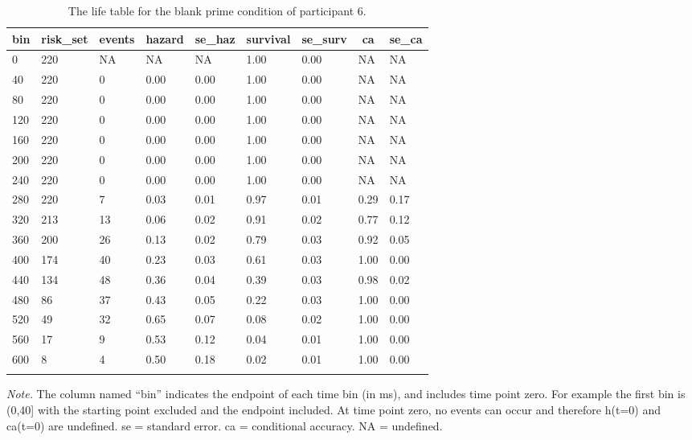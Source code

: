 \documentclass[
  man, donotrepeattitle,floatsintext]{apa6}
\begin{document}
\begin{table}[H]

\begin{center}
\begin{threeparttable}

\caption{\label{tab:life-table}The life table for the blank prime condition of participant 6.}

\begin{tabular}{lllllllll}
\toprule
bin & \multicolumn{1}{c}{risk\_set} & \multicolumn{1}{c}{events} & \multicolumn{1}{c}{hazard} & \multicolumn{1}{c}{se\_haz} & \multicolumn{1}{c}{survival} & \multicolumn{1}{c}{se\_surv} & \multicolumn{1}{c}{ca} & \multicolumn{1}{c}{se\_ca}\\
\midrule
0 & 220 & NA & NA & NA & 1.00 & 0.00 & NA & NA\\
40 & 220 & 0 & 0.00 & 0.00 & 1.00 & 0.00 & NA & NA\\
80 & 220 & 0 & 0.00 & 0.00 & 1.00 & 0.00 & NA & NA\\
120 & 220 & 0 & 0.00 & 0.00 & 1.00 & 0.00 & NA & NA\\
160 & 220 & 0 & 0.00 & 0.00 & 1.00 & 0.00 & NA & NA\\
200 & 220 & 0 & 0.00 & 0.00 & 1.00 & 0.00 & NA & NA\\
240 & 220 & 0 & 0.00 & 0.00 & 1.00 & 0.00 & NA & NA\\
280 & 220 & 7 & 0.03 & 0.01 & 0.97 & 0.01 & 0.29 & 0.17\\
320 & 213 & 13 & 0.06 & 0.02 & 0.91 & 0.02 & 0.77 & 0.12\\
360 & 200 & 26 & 0.13 & 0.02 & 0.79 & 0.03 & 0.92 & 0.05\\
400 & 174 & 40 & 0.23 & 0.03 & 0.61 & 0.03 & 1.00 & 0.00\\
440 & 134 & 48 & 0.36 & 0.04 & 0.39 & 0.03 & 0.98 & 0.02\\
480 & 86 & 37 & 0.43 & 0.05 & 0.22 & 0.03 & 1.00 & 0.00\\
520 & 49 & 32 & 0.65 & 0.07 & 0.08 & 0.02 & 1.00 & 0.00\\
560 & 17 & 9 & 0.53 & 0.12 & 0.04 & 0.01 & 1.00 & 0.00\\
600 & 8 & 4 & 0.50 & 0.18 & 0.02 & 0.01 & 1.00 & 0.00\\
\bottomrule
\addlinespace
\end{tabular}

\begin{tablenotes}[para]
\normalsize{\textit{Note.} The column named ``bin'' indicates the endpoint of each time bin (in ms), and includes time point zero. For example the first bin is (0,40{]} with the starting point excluded and the endpoint included. At time point zero, no events can occur and therefore h(t=0) and ca(t=0) are undefined. se = standard error. ca = conditional accuracy. NA = undefined.}
\end{tablenotes}

\end{threeparttable}
\end{center}

\end{table}
\end{document}
